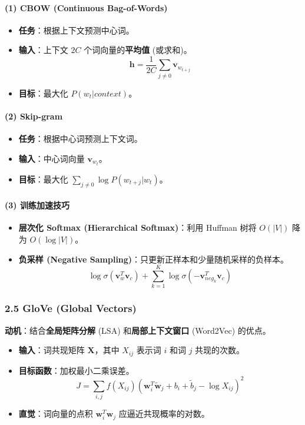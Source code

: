 \documentclass[a4paper, 11pt]{ctexart}
\begin{document}
\paragraph{(1) CBOW (Continuous Bag-of-Words)}
\begin{itemize}
    \item \textbf{任务}：根据上下文预测中心词。
    \item \textbf{输入}：上下文 $2C$ 个词向量的\textbf{平均值} (或求和)。
    $$ \mathbf{h} = \frac{1}{2C} \sum_{j \ne 0} \mathbf{v}_{w_{t+j}} $$
    \item \textbf{目标}：最大化 $P(w_t | context)$。
\end{itemize}

\paragraph{(2) Skip-gram}
\begin{itemize}
    \item \textbf{任务}：根据中心词预测上下文词。
    \item \textbf{输入}：中心词向量 $\mathbf{v}_{w_t}$。
    \item \textbf{目标}：最大化 $\sum_{j \ne 0} \log P(w_{t+j} | w_t)$。
\end{itemize}

\paragraph{(3) 训练加速技巧}
\begin{itemize}
    \item \textbf{层次化 Softmax (Hierarchical Softmax)}：利用 Huffman 树将 $O(|V|)$ 降为 $O(\log |V|)$。
    \item \textbf{负采样 (Negative Sampling)}：只更新正样本和少量随机采样的负样本。
    $$ \log \sigma(\mathbf{v}_w^T \mathbf{v}_c) + \sum_{k=1}^K \log \sigma(-\mathbf{v}_{neg_k}^T \mathbf{v}_c) $$
\end{itemize}

\subsubsection{2.5 GloVe (Global Vectors)}
\textbf{动机}：结合\textbf{全局矩阵分解} (LSA) 和\textbf{局部上下文窗口} (Word2Vec) 的优点。
\begin{itemize}
    \item \textbf{输入}：词共现矩阵 $\mathbf{X}$，其中 $X_{ij}$ 表示词 $i$ 和词 $j$ 共现的次数。
    \item \textbf{目标函数}：加权最小二乘误差。
    \begin{equation}
        J = \sum_{i,j} f(X_{ij}) (\mathbf{w}_i^T \tilde{\mathbf{w}}_j + b_i + \tilde{b}_j - \log X_{ij})^2
    \end{equation}
    \item \textbf{直觉}：词向量的点积 $\mathbf{w}_i^T \mathbf{w}_j$ 应逼近共现概率的对数。
\end{itemize}
\end{document}
